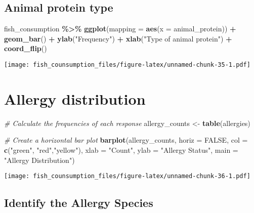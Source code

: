 \documentclass[
]{article}
\newenvironment{Shaded}{\begin{snugshade}}{\end{snugshade}}
\newcommand{\AttributeTok}[1]{\textcolor[rgb]{0.13,0.29,0.53}{#1}}
\newcommand{\CommentTok}[1]{\textcolor[rgb]{0.56,0.35,0.01}{\textit{#1}}}
\newcommand{\ConstantTok}[1]{\textcolor[rgb]{0.56,0.35,0.01}{#1}}
\newcommand{\FunctionTok}[1]{\textcolor[rgb]{0.13,0.29,0.53}{\textbf{#1}}}
\newcommand{\NormalTok}[1]{#1}
\newcommand{\OtherTok}[1]{\textcolor[rgb]{0.56,0.35,0.01}{#1}}
\newcommand{\SpecialCharTok}[1]{\textcolor[rgb]{0.81,0.36,0.00}{\textbf{#1}}}
\newcommand{\StringTok}[1]{\textcolor[rgb]{0.31,0.60,0.02}{#1}}
\begin{document}
\hypertarget{animal-protein-type}{%
\subsection{Animal protein type}\label{animal-protein-type}}

\begin{Shaded}
\begin{Highlighting}[]
\NormalTok{fish\_consumption }\SpecialCharTok{\%\textgreater{}\%}
\FunctionTok{ggplot}\NormalTok{(}\AttributeTok{mapping =} \FunctionTok{aes}\NormalTok{(}\AttributeTok{x =}\NormalTok{ animal\_protein)) }\SpecialCharTok{+}
\FunctionTok{geom\_bar}\NormalTok{() }\SpecialCharTok{+}
\FunctionTok{ylab}\NormalTok{(}\StringTok{"Frequency"}\NormalTok{) }\SpecialCharTok{+}
\FunctionTok{xlab}\NormalTok{(}\StringTok{"Type of animal protein"}\NormalTok{) }\SpecialCharTok{+}
\FunctionTok{coord\_flip}\NormalTok{()}
\end{Highlighting}
\end{Shaded}

\texttt{[image: fish\_counsumption\_files/figure-latex/unnamed-chunk-35-1.pdf]}

\hypertarget{allergy-distribution}{%
\section{Allergy distribution}\label{allergy-distribution}}

\begin{Shaded}
\begin{Highlighting}[]
\CommentTok{\# Calculate the frequencies of each response}
\NormalTok{allergy\_counts }\OtherTok{\textless{}{-}} \FunctionTok{table}\NormalTok{(allergies)}

\CommentTok{\# Create a horizontal bar plot}
\FunctionTok{barplot}\NormalTok{(allergy\_counts, }\AttributeTok{horiz =} \ConstantTok{FALSE}\NormalTok{, }\AttributeTok{col =} \FunctionTok{c}\NormalTok{(}\StringTok{"green"}\NormalTok{, }\StringTok{"red"}\NormalTok{,}\StringTok{"yellow"}\NormalTok{),}
        \AttributeTok{xlab =} \StringTok{"Count"}\NormalTok{, }\AttributeTok{ylab =} \StringTok{"Allergy Status"}\NormalTok{, }\AttributeTok{main =} \StringTok{"Allergy Distribution"}\NormalTok{)}
\end{Highlighting}
\end{Shaded}

\texttt{[image: fish\_counsumption\_files/figure-latex/unnamed-chunk-36-1.pdf]}

\hypertarget{identify-the-allergy-species}{%
\subsection{Identify the Allergy
Species}\label{identify-the-allergy-species}}
\end{document}
